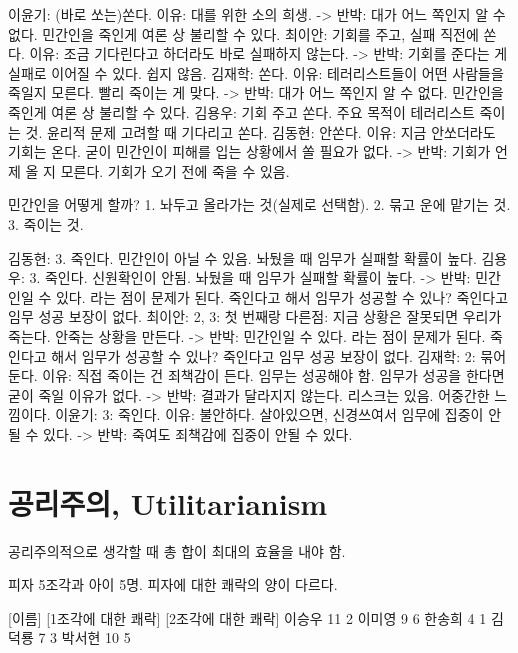 \begin{solution}
  이윤기: (바로 쏘는)쏜다. 이유: 대를 위한 소의 희생.
  -> 반박: 대가 어느 쪽인지 알 수 없다. 민간인을 죽인게 여론 상 불리할 수 있다.
  최이안: 기회를 주고, 실패 직전에 쏜다. 이유: 조금 기다린다고 하더라도 바로 실패하지 않는다.
  -> 반박: 기회를 준다는 게 실패로 이어질 수 있다. 쉽지 않음.
  김재학: 쏜다. 이유: 테러리스트들이 어떤 사람들을 죽일지 모른다. 빨리 죽이는 게 맞다.
  -> 반박: 대가 어느 쪽인지 알 수 없다. 민간인을 죽인게 여론 상 불리할 수 있다.
  김용우: 기회 주고 쏜다. 주요 목적이 테러리스트 죽이는 것. 윤리적 문제 고려할 때 기다리고 쏜다.
  김동현: 안쏜다. 이유: 지금 안쏘더라도 기회는 온다. 굳이 민간인이 피해를 입는 상황에서 쏠 필요가 없다.
  -> 반박: 기회가 언제 올 지 모른다. 기회가 오기 전에 죽을 수 있음.
\end{solution}

\begin{exercise}
  민간인을 어떻게 할까? 1. 놔두고 올라가는 것(실제로 선택함). 2. 묶고 운에 맡기는 것. 3. 죽이는 것.
\end{exercise}

\begin{solution}
  김동현: 3. 죽인다. 민간인이 아닐 수 있음. 놔뒀을 때 임무가 실패할 확률이 높다.
  김용우: 3. 죽인다. 신원확인이 안됨. 놔뒀을 때 임무가 실패할 확률이 높다.
  -> 반박: 민간인일 수 있다. 라는 점이 문제가 된다. 죽인다고 해서 임무가 성공할 수 있나?
  죽인다고 임무 성공 보장이 없다.
  최이안: 2, 3: 첫 번째랑 다른점: 지금 상황은 잘못되면 우리가 죽는다. 안죽는 상황을 만든다.
  -> 반박: 민간인일 수 있다. 라는 점이 문제가 된다. 죽인다고 해서 임무가 성공할 수 있나?
  죽인다고 임무 성공 보장이 없다.
  김재학: 2: 묶어둔다. 이유: 직접 죽이는 건 죄책감이 든다. 임무는 성공해야 함. 임무가 성공을 한다면 굳이 죽일 이유가 없다.
  -> 반박: 결과가 달라지지 않는다. 리스크는 있음. 어중간한 느낌이다.
  이윤기: 3: 죽인다. 이유: 불안하다. 살아있으면, 신경쓰여서 임무에 집중이 안될 수 있다.
  -> 반박: 죽여도 죄책감에 집중이 안될 수 있다.
\end{solution}

\section{공리주의, Utilitarianism}

공리주의적으로 생각할 때 총 합이 최대의 효율을 내야 함.

피자 5조각과 아이 5명. 피자에 대한 쾌락의 양이 다르다.

[이름] [1조각에 대한 쾌락] [2조각에 대한 쾌락]
이승우 11 2
이미영 9 6
한송희 4 1
김덕룡 7 3
박서현 10 5

